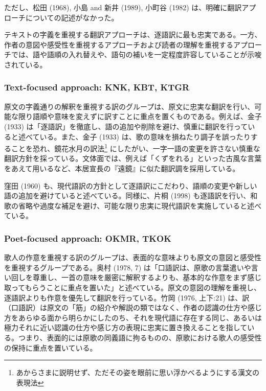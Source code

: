 \documentclass[
  letterpaper,
  DIV=11,
  numbers=noendperiod]{scrartcl}
\begin{document}
ただし、松田 (1968), 小島 and 新井 (1989), 小町谷 (1982)
は、明確に翻訳アプローチについての記述がなかった。

テキストの字義を重視する翻訳アプローチは、逐語訳に最も忠実である。一方、作者の意図や感受性を重視するアプローチおよび読者の理解を重視するアプローチでは、語や語順の入れ替えや、語句の補いを一定程度許容していることが示唆されている。

\subsubsection*{Text-focused approach: KNK, KBT,
KTGR}\label{text-focused-approach-knk-kbt-ktgr}

原文の字義通りの解釈を重視する訳のグループは、原文に忠実な翻訳を行い、可能な限り語順や意味を変えずに訳すことに重点を置くものである。例えば、金子
(1933)
は「逐語訳」を徹底し、語の追加や削除を避け、慎重に翻訳を行っていると述べている。また、金子
(1933)
は、歌の意味を損ねたり調子を誤ったりすることを恐れ、鏡花水月の訳法\footnote{あからさまに説明せず、ただその姿を眼前に思い浮かべるようにする漢文の表現法}
にしたがい、一字一語の変更を許さない慎重な翻訳方針を採っている。文体面では、例えば「くずをれる」といった古風な言葉をあえて用いるなど、本居宣長の『遠鏡』に似た翻訳調を採用している。

窪田 (1960)
も、現代語訳の方針として逐語訳にこだわり、語順の変更や新しい語の追加を避けていると述べている。同様に、片桐
(1998)
も逐語訳を行い、和歌の省略や過度な補足を避け、可能な限り忠実に現代語訳を実施していると述べている。

\subsubsection*{Poet-focused approach: OKMR,
TKOK}\label{poet-focused-approach-okmr-tkok}

歌人の作意を重視する訳のグループは、表面的な意味よりも原文の意図と感受性を重視するグループである。奥村
(1978, 7)
は「口語訳は、原歌の言葉遣いや言い回しを尊重し、一首の意味を厳密に解釈するよりも、基本的な作意をまず感じ取ってもらうことに重点を置いた」と述べている。原文の意図の理解を重視し、逐語訳よりも作意を優先して翻訳を行っている。竹岡
(1976, 上下:21)
は、訳（口語訳）は原文の「筋」の紹介や解説の類ではなく、作者の認識の仕方や感じ方をあらゆる面から明らかにしたのち、それを現代語に存在する同じ、あるいは極力それに近い認識の仕方や感じ方の表現に忠実に置き換えることを指している。つまり、表面的には原歌の同義語に拘るものの、原歌における歌人の感受性の保持に重点を置いている。
\end{document}
